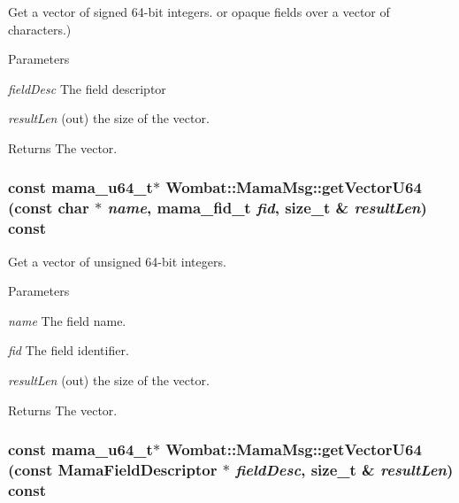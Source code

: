 Get a vector of signed 64-\/bit integers. or opaque fields over a vector of characters.) 
\begin{DoxyParams}{Parameters}
\item[{\em fieldDesc}]The field descriptor \item[{\em resultLen}](out) the size of the vector. \end{DoxyParams}
\begin{DoxyReturn}{Returns}
The vector. 
\end{DoxyReturn}
\hypertarget{classWombat_1_1MamaMsg_a907a4297ff0b7153b94984b970273d04}{
\subsubsection[{getVectorU64}]{\setlength{\rightskip}{0pt plus 5cm}const mama\_\-u64\_\-t$\ast$ Wombat::MamaMsg::getVectorU64 (const char $\ast$ {\em name}, \/  mama\_\-fid\_\-t {\em fid}, \/  size\_\-t \& {\em resultLen}) const}}
\label{classWombat_1_1MamaMsg_a907a4297ff0b7153b94984b970273d04}


Get a vector of unsigned 64-\/bit integers. 
\begin{DoxyParams}{Parameters}
\item[{\em name}]The field name. \item[{\em fid}]The field identifier. \item[{\em resultLen}](out) the size of the vector. \end{DoxyParams}
\begin{DoxyReturn}{Returns}
The vector. 
\end{DoxyReturn}
\hypertarget{classWombat_1_1MamaMsg_a162e09dd29b18684ec70b97a580e7644}{
\subsubsection[{getVectorU64}]{\setlength{\rightskip}{0pt plus 5cm}const mama\_\-u64\_\-t$\ast$ Wombat::MamaMsg::getVectorU64 (const {\bf MamaFieldDescriptor} $\ast$ {\em fieldDesc}, \/  size\_\-t \& {\em resultLen}) const}}
\label{classWombat_1_1MamaMsg_a162e09dd29b18684ec70b97a580e7644}


